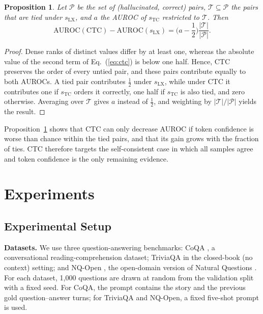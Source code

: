 \documentclass[10pt]{article}
\newtheorem{proposition}{Proposition}
\newcommand{\sLX}{s_{\mathrm{LX}}}
\newcommand{\sTC}{s_{\mathrm{TC}}}
\begin{document}
\begin{proposition}\label{prop:ctc}
Let $\mathcal{P}$ be the set of (hallucinated, correct) pairs, $\mathcal{T}\subseteq\mathcal{P}$ the pairs that are tied under $\sLX$, and $a$ the AUROC of $\sTC$ restricted to $\mathcal{T}$. Then
\begin{equation}
\mathrm{AUROC}(\mathrm{CTC})-\mathrm{AUROC}(\sLX)=\Big(a-\frac12\Big)\frac{|\mathcal{T}|}{|\mathcal{P}|}.
\end{equation}
\end{proposition}
\begin{proof}
Dense ranks of distinct values differ by at least one, whereas the absolute value of the second term of Eq.~(\ref{eq:ctc}) is below one half. Hence, CTC preserves the order of every untied pair, and these pairs contribute equally to both AUROCs. A tied pair contributes $\frac12$ under $\sLX$, while under CTC it contributes one if $\sTC$ orders it correctly, one half if $\sTC$ is also tied, and zero otherwise. Averaging over $\mathcal{T}$ gives $a$ instead of $\frac12$, and weighting by $|\mathcal{T}|/|\mathcal{P}|$ yields the result.
\end{proof}

Proposition~\ref{prop:ctc} shows that CTC can only decrease AUROC if token confidence is worse than chance within the tied pairs, and that its gain grows with the fraction of ties. CTC therefore targets the self-consistent case in which all samples agree and token confidence is the only remaining evidence.

\section{Experiments}\label{sec:experiments}
\subsection{Experimental Setup}
\textbf{Datasets.} We use three question-answering benchmarks: CoQA \citep{reddy2019coqa}, a conversational reading-comprehension dataset; TriviaQA \citep{joshi2017triviaqa} in the closed-book (no context) setting; and NQ-Open \citep{lee2019latent}, the open-domain version of Natural Questions \citep{kwiatkowski2019natural}. For each dataset, 1,000 questions are drawn at random from the validation split with a fixed seed. For CoQA, the prompt contains the story and the previous gold question--answer turns; for TriviaQA and NQ-Open, a fixed five-shot prompt is used.
\end{document}
